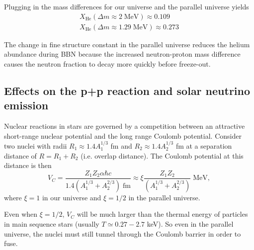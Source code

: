 \documentclass[%
 reprint,
 amsmath,amssymb,
 aps,
]{revtex4-1}
\begin{document}
Plugging in the mass differences for our universe and the parallel universe yields
\begin{align}
	X_\text{He}(\Delta m \approx 2 \; \text{MeV}) \approx 0.109 \\
	X_\text{He}(\Delta m \approx 1.29 \; \text{MeV}) \approx 0.273
\end{align}

The change in fine structure constant in the parallel universe reduces the helium abundance during BBN because the increased neutron-proton mass difference causes the neutron fraction to decay more quickly before freeze-out.

\subsection{\label{sec:neutrinos}Effects on the p+p reaction and solar neutrino emission}

Nuclear reactions in stars are governed by a competition between an attractive short-range nuclear potential and the long range Coulomb potential. Consider two nuclei with radii $R_1 \approx 1.4 A_1^{1/3}$ fm and $R_2 \approx 1.4 A_2^{1/3}$ fm at a separation distance of $R = R_1 + R_2$ (i.e. overlap distance). The Coulomb potential at this distance is then
\begin{equation}
    V_C = \frac{Z_1 Z_2 \alpha \hbar c}{
    1.4 \left(A_1^{1/3} + A_2^{2/3} \right) \; \text{fm}}
    \approx
    \xi \frac{Z_1 Z_2}{
    \left(A_1^{1/3} + A_2^{2/3} \right)} \; \text{MeV},
\end{equation}
where $\xi = 1$ in our universe and $\xi = 1/2$ in the parallel universe.

Even when $\xi = 1/2$, $V_C$ will be much larger than the thermal energy of particles in main sequence stars (usually $T \simeq 0.27 - 2.7$ keV). So even in the parallel universe, the nuclei must still tunnel through the Coulomb barrier in order to fuse.
\end{document}
